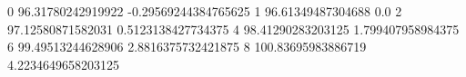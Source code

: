0 96.31780242919922 -0.29569244384765625
1 96.61349487304688 0.0
2 97.12580871582031 0.5123138427734375
4 98.41290283203125 1.799407958984375
6 99.49513244628906 2.8816375732421875
8 100.83695983886719 4.2234649658203125
